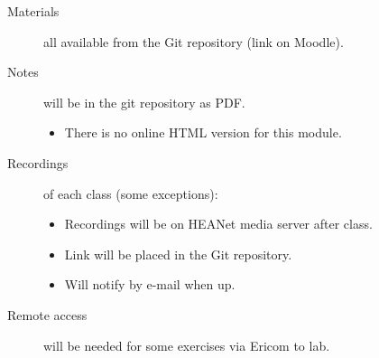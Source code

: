 \documentclass[slides]{pgnotes}
\begin{document}
\begin{description}

\item[Materials] all available from the Git repository (link on Moodle).
  
\item[Notes] will be in the git repository as PDF. 
  \begin{itemize}
  \item There is no online HTML version for this module.
  \end{itemize}
  
\item[Recordings] of each class (some exceptions):
  \begin{itemize}
  \item Recordings will be on HEANet media server after class.
  \item Link will be placed in the Git repository.
  \item Will notify by e-mail when up.
  \end{itemize}

\item[Remote access] will be needed for some exercises via Ericom to lab.

\end{description}
\end{document}
